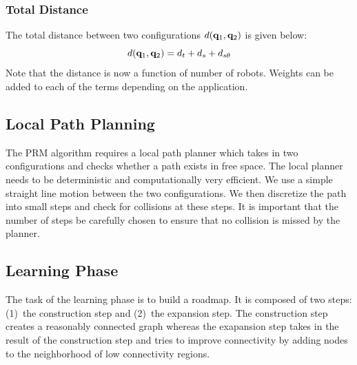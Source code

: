 \documentclass[12pt,a4paper, onecolumn]{IEEEtran}
\begin{document}
\subsubsection{Total Distance}
The total distance between two configurations $d(\mathbf{q}_1, \mathbf{q}_2)$ is given below:
\begin{equation}
  d(\mathbf{q}_1, \mathbf{q}_2) = d_t +d_s +d_{s\theta}
  \label{eqn:dF}
\end{equation}
Note that the distance is now a function of number of robots. Weights can be added to
each of the terms depending on the application.
\subsection{Local Path Planning}
The PRM algorithm requires a local path planner which takes in two configurations and
checks whether a path exists in free space. The local planner needs to be deterministic
and computationally very efficient. We use a simple straight line motion between the two
configurations. We then discretize the path into small steps and check for collisions at
these steps. It is important that the number of steps be carefully chosen to ensure that
no collision is missed by the planner.

\subsection{Learning Phase}
The task of the learning phase is to build a roadmap. It is composed of two steps: (1)~the construction step and (2)~the expansion step. The construction step creates a reasonably connected graph whereas the exapansion step takes in the result of the construction step and tries to improve connectivity by adding nodes to the neighborhood of low connectivity regions.
\end{document}
